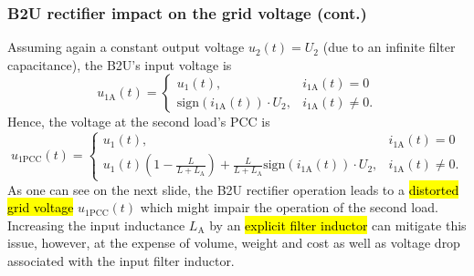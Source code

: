 \begin{frame}
	\frametitle{B2U rectifier impact on the grid voltage (cont.)}
	Assuming again a constant output voltage $u_2(t)=U_2$ (due to an infinite filter capacitance), the B2U's input voltage is
	\begin{equation}
		u_{1\mathrm{A}}(t) = \begin{cases} u_{1}(t), & i_{1\mathrm{A}}(t)=0 \\ \mathrm{sign}(i_{1\mathrm{A}}(t))\cdot U_2, &i_{1\mathrm{A}}(t) \neq 0.
		\end{cases}
	\end{equation}\pause
	Hence, the voltage at the second load's PCC is
	\begin{equation}
		u_{1\mathrm{PCC}}(t) = \begin{cases} u_1(t), & i_{1\mathrm{A}}(t)=0\\  u_1(t)\left(1-\frac{L}{L+L_\mathrm{A}}\right) + \frac{L}{L+L_\mathrm{A}}\mathrm{sign}(i_{1\mathrm{A}}(t))\cdot U_2, & i_{1\mathrm{A}}(t) \neq 0. \end{cases}
	\end{equation}\pause
	As one can see on the next slide, the B2U rectifier operation leads to a \hl{distorted grid voltage} $u_{1\mathrm{PCC}}(t)$ which might impair the operation of the second load. Increasing the input inductance $L_\mathrm{A}$ by an \hl{explicit filter inductor} can mitigate this issue, however, at the expense of volume, weight and cost as well as voltage drop associated with the input filter inductor.
\end{frame}

